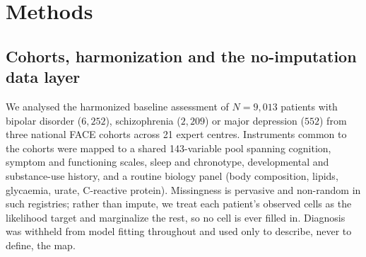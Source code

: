 \section{Methods}

\subsection{Cohorts, harmonization and the no-imputation data layer}
We analysed the harmonized baseline assessment of $N=9{,}013$ patients with bipolar disorder
($6{,}252$), schizophrenia ($2{,}209$) or major depression ($552$) from three national FACE
cohorts across 21 expert centres. Instruments common to the cohorts were mapped to a shared
143-variable pool spanning cognition, symptom and functioning scales, sleep and chronotype,
developmental and substance-use history, and a routine biology panel (body composition, lipids,
glycaemia, urate, C-reactive protein). Missingness is pervasive and non-random in such registries;
rather than impute, we treat each patient's observed cells as the likelihood target and marginalize
the rest, so no cell is ever filled in. Diagnosis was withheld from model fitting throughout and
used only to describe, never to define, the map.

